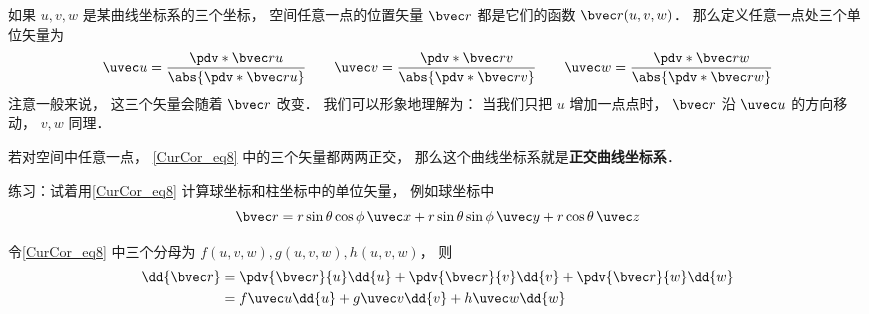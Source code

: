 
\begin{issues}
\issueDraft
\end{issues}


如果 $u, v, w$ 是某曲线坐标系的三个坐标， 空间任意一点的位置矢量 $\bvec r$ 都是它们的函数 $\bvec r(u, v, w)$． 那么定义任意一点处三个单位矢量为
\begin{equation}\label{CurCor_eq8}
\uvec u = \frac{\pdv*{\bvec r}{u}}{\abs{\pdv*{\bvec r}{u}}}\qquad
\uvec v = \frac{\pdv*{\bvec r}{v}}{\abs{\pdv*{\bvec r}{v}}}\qquad
\uvec w = \frac{\pdv*{\bvec r}{w}}{\abs{\pdv*{\bvec r}{w}}}
\end{equation}
注意一般来说， 这三个矢量会随着 $\bvec r$ 改变． 我们可以形象地理解为： 当我们只把 $u$ 增加一点点时， $\bvec r$ 沿 $\uvec u$ 的方向移动， $v, w$ 同理．

若对空间中任意一点， \autoref{CurCor_eq8} 中的三个矢量都两两正交， 那么这个曲线坐标系就是\textbf{正交曲线坐标系}．
\begin{exercise}{}
练习：试着用\autoref{CurCor_eq8} 计算球坐标和柱坐标中的单位矢量， 例如球坐标中
\begin{equation}
\bvec r = r\sin\theta\cos\phi\,\uvec x + r\sin\theta\sin\phi\,\uvec y + r\cos\theta\,\uvec z
\end{equation}
\end{exercise}

令\autoref{CurCor_eq8} 中三个分母为 $f(u,v,w), g(u,v,w), h(u,v,w)$， 则
\begin{equation}\label{CurCor_eq4}
\begin{aligned}
\dd{\bvec r} &= \pdv{\bvec r}{u}\dd{u} + \pdv{\bvec r}{v}\dd{v} + \pdv{\bvec r}{w}\dd{w}\\
&= f\uvec u\dd{u} + g\uvec v\dd{v} + h\uvec w\dd{w}
\end{aligned}
\end{equation}

